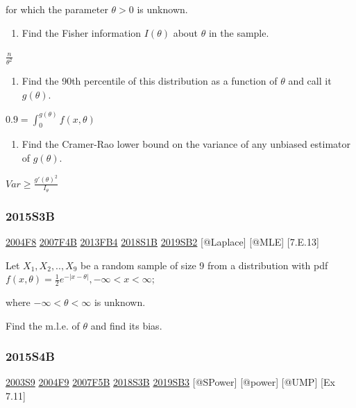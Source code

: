\documentclass[6pt,Portrait]{article}
\providecommand{\tightlist}{%
  \setlength{\itemsep}{0pt}\setlength{\parskip}{0pt}}
\begin{document}
for which the parameter \(\theta>0\) is unknown.

\begin{enumerate}
\def\labelenumi{(\alph{enumi})}
\tightlist
\item
  Find the Fisher information \(I(\theta)\) about \(\theta\) in the
  sample.
\end{enumerate}

\(\frac{n}{\theta^2}\)

\begin{enumerate}
\def\labelenumi{(\alph{enumi})}
\setcounter{enumi}{1}
\tightlist
\item
  Find the 90th percentile of this distribution as a function of
  \(\theta\) and call it \(g(\theta)\).
\end{enumerate}

\(0.9=\int_0^{g(\theta)}f(x,\theta)\)

\begin{enumerate}
\def\labelenumi{(\alph{enumi})}
\setcounter{enumi}{2}
\tightlist
\item
  Find the Cramer-Rao lower bound on the variance of any unbiased
  estimator of \(g(\theta)\).
\end{enumerate}

\(Var\ge\frac{g'(\theta)^2}{I_{\theta}}\)

\hypertarget{s3b-1}{%
\subsubsection{2015S3B}\label{s3b-1}}

\protect\hyperlink{f8-2}{2004F8} \protect\hyperlink{f4b}{2007F4B}
\protect\hyperlink{fb4-2}{2013FB4} \protect\hyperlink{s1b-2}{2018S1B}
\protect\hyperlink{sb2-3}{2019SB2} {[}@Laplace{]} {[}@MLE{]}
{[}7.E.13{]}\protect\hyperlink{section}{}

Let \(X_1,X_2,..,X_9\) be a random sample of size 9 from a distribution
with pdf \(f(x,\theta) =\frac12e^{-|x-\theta|}, -\infty<x<\infty\);

where \(-\infty<\theta<\infty\) is unknown.

Find the m.l.e. of \(\theta\) and find its bias.

\hypertarget{s4b-1}{%
\subsubsection{2015S4B}\label{s4b-1}}

\protect\hyperlink{s9}{2003S9} \protect\hyperlink{f9-2}{2004F9}
\protect\hyperlink{f5b}{2007F5B} \protect\hyperlink{s3b-2}{2018S3B}
\protect\hyperlink{sb3-3}{2019SB3} {[}@SPower{]} {[}@power{]} {[}@UMP{]}
{[}Ex 7.11{]}
\end{document}
